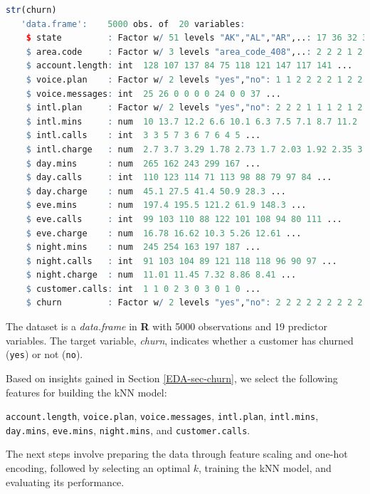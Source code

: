 \documentclass[
  11pt,
]{book}
\newcommand{\passthrough}[1]{#1}
\theoremstyle{definition}
\theoremstyle{definition}
\theoremstyle{definition}
\theoremstyle{definition}
\theoremstyle{remark}
\begin{document}
\begin{lstlisting}[language=R]
str(churn)
   'data.frame':    5000 obs. of  20 variables:
    $ state         : Factor w/ 51 levels "AK","AL","AR",..: 17 36 32 36 37 2 20 25 19 50 ...
    $ area.code     : Factor w/ 3 levels "area_code_408",..: 2 2 2 1 2 3 3 2 1 2 ...
    $ account.length: int  128 107 137 84 75 118 121 147 117 141 ...
    $ voice.plan    : Factor w/ 2 levels "yes","no": 1 1 2 2 2 2 1 2 2 1 ...
    $ voice.messages: int  25 26 0 0 0 0 24 0 0 37 ...
    $ intl.plan     : Factor w/ 2 levels "yes","no": 2 2 2 1 1 1 2 1 2 1 ...
    $ intl.mins     : num  10 13.7 12.2 6.6 10.1 6.3 7.5 7.1 8.7 11.2 ...
    $ intl.calls    : int  3 3 5 7 3 6 7 6 4 5 ...
    $ intl.charge   : num  2.7 3.7 3.29 1.78 2.73 1.7 2.03 1.92 2.35 3.02 ...
    $ day.mins      : num  265 162 243 299 167 ...
    $ day.calls     : int  110 123 114 71 113 98 88 79 97 84 ...
    $ day.charge    : num  45.1 27.5 41.4 50.9 28.3 ...
    $ eve.mins      : num  197.4 195.5 121.2 61.9 148.3 ...
    $ eve.calls     : int  99 103 110 88 122 101 108 94 80 111 ...
    $ eve.charge    : num  16.78 16.62 10.3 5.26 12.61 ...
    $ night.mins    : num  245 254 163 197 187 ...
    $ night.calls   : int  91 103 104 89 121 118 118 96 90 97 ...
    $ night.charge  : num  11.01 11.45 7.32 8.86 8.41 ...
    $ customer.calls: int  1 1 0 2 3 0 3 0 1 0 ...
    $ churn         : Factor w/ 2 levels "yes","no": 2 2 2 2 2 2 2 2 2 2 ...
\end{lstlisting}

The dataset is a \emph{data.frame} in \textbf{R} with 5000 observations and 19 predictor variables. The target variable, \emph{churn}, indicates whether a customer has churned (\passthrough{\lstinline!yes!}) or not (\passthrough{\lstinline!no!}).

Based on insights gained in Section \ref{EDA-sec-churn}, we select the following features for building the kNN model:

\passthrough{\lstinline!account.length!}, \passthrough{\lstinline!voice.plan!}, \passthrough{\lstinline!voice.messages!}, \passthrough{\lstinline!intl.plan!}, \passthrough{\lstinline!intl.mins!}, \passthrough{\lstinline!day.mins!}, \passthrough{\lstinline!eve.mins!}, \passthrough{\lstinline!night.mins!}, and \passthrough{\lstinline!customer.calls!}.

The next steps involve preparing the data through feature scaling and one-hot encoding, followed by selecting an optimal \(k\), training the kNN model, and evaluating its performance.
\end{document}
